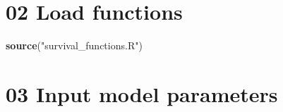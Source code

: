 \documentclass[
]{article}
\newenvironment{Shaded}{\begin{snugshade}}{\end{snugshade}}
\newcommand{\KeywordTok}[1]{\textcolor[rgb]{0.13,0.29,0.53}{\textbf{#1}}}
\newcommand{\NormalTok}[1]{#1}
\newcommand{\StringTok}[1]{\textcolor[rgb]{0.31,0.60,0.02}{#1}}
\begin{document}
\hypertarget{load-functions}{%
\section{02 Load functions}\label{load-functions}}

\begin{Shaded}
\begin{Highlighting}[]
\KeywordTok{source}\NormalTok{(}\StringTok{"survival_functions.R"}\NormalTok{)}
\end{Highlighting}
\end{Shaded}

\hypertarget{input-model-parameters}{%
\section{03 Input model parameters}\label{input-model-parameters}}
\end{document}
